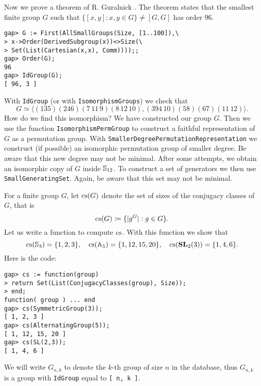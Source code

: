 \begin{example}
\label{exa:Guralnick:96}
Now we prove a theorem of R. Guralnick \cite{MR673806}. The theorem states
that the smallest finite group $G$ such that $\{[x,y]:x,y\in G\}\ne[G,G]$ has
order $96$.
\begin{lstlisting}
gap> G := First(AllSmallGroups(Size, [1..100]),\
> x->Order(DerivedSubgroup(x))<>Size(\
> Set(List(Cartesian(x,x), Comm))));;
gap> Order(G);
96
gap> IdGroup(G);
[ 96, 3 ]
\end{lstlisting}
With \lstinline{IdGroup} (or with \lstinline{IsomorphismGroups}) we check that 
\[
G\simeq\langle (135)(246)(7\,11\,9)(8\,12\,10),(394\,10)(58)(67)(11\,12)\rangle.
\]
How do we find this isomorphism? %
We have constructed our group $G$.  Then we use the function \lstinline{IsomorphismPermGroup} to
construct a faithful representation of $G$ as a permutation group. With
\lstinline{SmallerDegreePermutationRepresentation} we construct (if possible) an isomorphic
permutation group of smaller degree. Be aware that this new degree may not be minimal.
After some attempts, we obtain 
an isomorphic copy of $G$ inside $\mathbb{S}_{12}$. To construct a set of generators we then use 
\lstinline{SmallGeneratingSet}. Again, be aware that this set may not be minimal.
\end{example}

For a finite group $G$, let $\operatorname{cs}(G)$ denote the set of sizes of the conjugacy
classes of $G$, that is
\[
\operatorname{cs}(G)\coloneqq \{|g^G|:g\in G\}.
\]  Let us write a function to compute $\operatorname{cs}$. With this function
we show that
  \[
    \operatorname{cs}(\mathbb{S}_3)=\{1,2,3\},
    \quad
    \operatorname{cs}(\mathbb{A}_5)=\{1,12,15,20\},
    \quad
    \operatorname{cs}(\mathbf{SL}_2(3))=\{1,4,6\}.
  \]
Here is the code:
\begin{lstlisting}
gap> cs := function(group)
> return Set(List(ConjugacyClasses(group), Size));
> end;
function( group ) ... end
gap> cs(SymmetricGroup(3));
[ 1, 2, 3 ]
gap> cs(AlternatingGroup(5));
[ 1, 12, 15, 20 ]
gap> cs(SL(2,3));
[ 1, 4, 6 ]
\end{lstlisting}

We will write $G_{n,k}$ to denote the $k$-th group of size $n$ in the database,
thus $G_{n,k}$ is a group with \lstinline{IdGroup} equal to \lstinline{[ n, k ]}.

